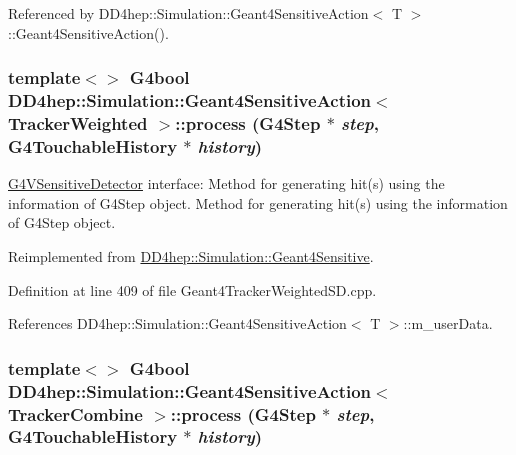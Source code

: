 Referenced by DD4hep::Simulation::Geant4SensitiveAction$<$ T $>$::Geant4SensitiveAction().\hypertarget{class_d_d4hep_1_1_simulation_1_1_geant4_sensitive_action_a97df218d3791d86a41d0ad52a780e87e}{
\subsubsection[{process}]{\setlength{\rightskip}{0pt plus 5cm}template$<$$>$ G4bool {\bf DD4hep::Simulation::Geant4SensitiveAction}$<$ {\bf TrackerWeighted} $>$::process (G4Step $\ast$ {\em step}, \/  G4TouchableHistory $\ast$ {\em history})}}
\label{class_d_d4hep_1_1_simulation_1_1_geant4_sensitive_action_a97df218d3791d86a41d0ad52a780e87e}


\hyperlink{class_g4_v_sensitive_detector}{G4VSensitiveDetector} interface: Method for generating hit(s) using the information of G4Step object. Method for generating hit(s) using the information of G4Step object. 

Reimplemented from \hyperlink{class_d_d4hep_1_1_simulation_1_1_geant4_sensitive_a9a9463a6c29a66dad43a52ffc9f7838d}{DD4hep::Simulation::Geant4Sensitive}.

Definition at line 409 of file Geant4TrackerWeightedSD.cpp.

References DD4hep::Simulation::Geant4SensitiveAction$<$ T $>$::m\_\-userData.\hypertarget{class_d_d4hep_1_1_simulation_1_1_geant4_sensitive_action_a66fa5dd6c3ea881689b16f73e9c7887b}{
\subsubsection[{process}]{\setlength{\rightskip}{0pt plus 5cm}template$<$$>$ G4bool {\bf DD4hep::Simulation::Geant4SensitiveAction}$<$ {\bf TrackerCombine} $>$::process (G4Step $\ast$ {\em step}, \/  G4TouchableHistory $\ast$ {\em history})}}
\label{class_d_d4hep_1_1_simulation_1_1_geant4_sensitive_action_a66fa5dd6c3ea881689b16f73e9c7887b}


